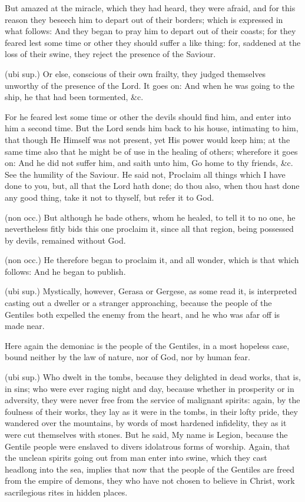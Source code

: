  But amazed at the miracle, which they had heard, they were afraid, and for this reason they beseech him to depart out of their borders; which is expressed in what follows: And they began to pray him to depart out of their coasts; for they feared lest some time or other they should suffer a like thing: for, saddened at the loss of their swine, they reject the presence of the Saviour.

 (ubi sup.) Or else, conscious of their own frailty, they judged themselves unworthy of the presence of the Lord. It goes on: And when he was going to the ship, he that had been tormented, \&c.

 For he feared lest some time or other the devils should find him, and enter into him a second time. But the Lord sends him back to his house, intimating to him, that though He Himself was not present, yet His power would keep him; at the same time also that he might be of use in the healing of others; wherefore it goes on: And he did not suffer him, and saith unto him, Go home to thy friends, \&c. See the humility of the Saviour. He said not, Proclaim all things which I have done to you, but, all that the Lord hath done; do thou also, when thou hast done any good thing, take it not to thyself, but refer it to God.

 (non occ.) But although he bade others, whom he healed, to tell it to no one, he nevertheless fitly bids this one proclaim it, since all that region, being possessed by devils, remained without God.

 (non occ.) He therefore began to proclaim it, and all wonder, which is that which follows: And he began to publish.

 (ubi sup.) Mystically, however, Gerasa or Gergese, as some read it, is interpreted casting out a dweller or a stranger approaching, because the people of the Gentiles both expelled the enemy from the heart, and he who was afar off is made near.

 Here again the demoniac is the people of the Gentiles, in a most hopeless case, bound neither by the law of nature, nor of God, nor by human fear.

 (ubi sup.) Who dwelt in the tombs, because they delighted in dead works, that is, in sins; who were ever raging night and day, because whether in prosperity or in adversity, they were never free from the service of malignant spirits: again, by the foulness of their works, they lay as it were in the tombs, in their lofty pride, they wandered over the mountains, by words of most hardened infidelity, they as it were cut themselves with stones. But he said, My name is Legion, because the Gentile people were enslaved to divers idolatrous forms of worship. Again, that the unclean spirits going out from man enter into swine, which they cast headlong into the sea, implies that now that the people of the Gentiles are freed from the empire of demons, they who have not chosen to believe in Christ, work sacrilegious rites in hidden places.

